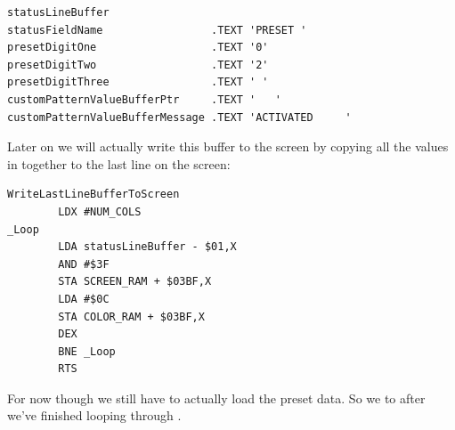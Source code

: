 \begin{lstlisting}
statusLineBuffer
statusFieldName                 .TEXT 'PRESET '
presetDigitOne                  .TEXT '0'
presetDigitTwo                  .TEXT '2'
presetDigitThree                .TEXT ' '
customPatternValueBufferPtr     .TEXT '   '
customPatternValueBufferMessage .TEXT 'ACTIVATED     '
\end{lstlisting}

Later on we will actually write this buffer to the screen by copying all the values in  together to the last line on the screen:

\begin{lstlisting}
WriteLastLineBufferToScreen    
        LDX #NUM_COLS
_Loop   
        LDA statusLineBuffer - $01,X
        AND #$3F
        STA SCREEN_RAM + $03BF,X
        LDA #$0C
        STA COLOR_RAM + $03BF,X
        DEX 
        BNE _Loop
        RTS 
\end{lstlisting}

For now though we still have to actually load the preset data. So we  to  after we've finished looping through .

